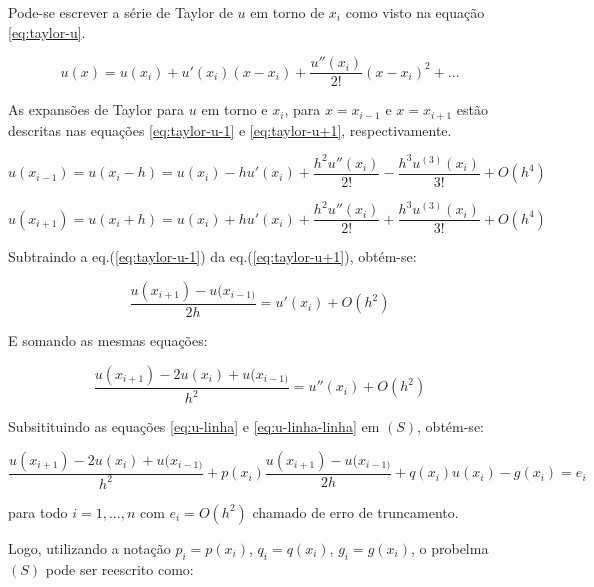 Pode-se escrever a série de Taylor de $u$ em torno de $x_i$ como visto na equação \ref{eq:taylor-u}.

\begin{equation} \label{eq:taylor-u}
u(x) = u(x_i) + u'(x_i)(x-x_i) + \dfrac{u''(x_i)}{2!}(x-x_i)^2 + ...
\end{equation}

As expansões de Taylor para $u$ em torno e $x_i$, para $x=x_{i-1}$ e $x=x_{i+1}$ estão descritas nas equações \ref{eq:taylor-u-1} e \ref{eq:taylor-u+1}, respectivamente.

\begin{equation} \label{eq:taylor-u-1}
u(x_{i-1}) = u(x_i-h) = u(x_i) - hu'(x_i) + \dfrac{h^2u''(x_i)}{2!} - \dfrac{h^3 u^{(3)}(x_i)}{3!} + O(h^4)
\end{equation}


\begin{equation} \label{eq:taylor-u+1}
u(x_{i+1}) = u(x_i+h) = u(x_i) + hu'(x_i) + \dfrac{h^2u''(x_i)}{2!} + \dfrac{h^3 u^{(3)}(x_i)}{3!} + O(h^4)
\end{equation}

Subtraindo a eq.(\ref{eq:taylor-u-1}) da eq.(\ref{eq:taylor-u+1}), obtém-se:

\begin{equation} \label{eq:u-linha}
\dfrac{u(x_{i+1}) - u(x_{i-1)}}{2h} = u'(x_i) + O(h^2)
\end{equation}

E somando as mesmas equações:

\begin{equation} \label{eq:u-linha-linha}
\dfrac{u(x_{i+1}) -2u(x_i) + u(x_{i-1)}}{h^2} = u''(x_i) + O(h^2)
\end{equation}

Subsitituindo as equações \ref{eq:u-linha} e \ref{eq:u-linha-linha} em $(S)$, obtém-se:

\begin{equation} \label{eq:u-linha-linha}
\dfrac{u(x_{i+1}) -2u(x_i) + u(x_{i-1)}}{h^2} + p(x_i)\dfrac{u(x_{i+1}) - u(x_{i-1)}}{2h}  + q(x_i)u(x_i) - g(x_i) = e_i
\end{equation}

para todo $i=1, ..., n$ com $e_i = O(h^2)$ chamado de erro de truncamento.
 
\par Logo, utilizando a notação $p_i = p(x_i)$, $q_i = q(x_i)$, $g_i = g(x_i)$, o probelma $(S)$ pode ser reescrito como:

